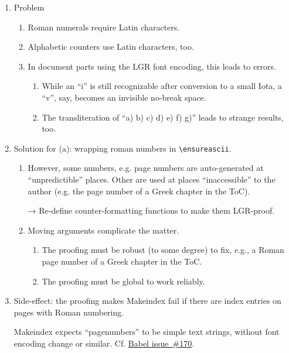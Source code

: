 \documentclass[a4paper,oneside]{book}
\begin{document}
\begin{enumerate}
  \item Problem
  \begin{enumerate}
    \item Roman numerals require Latin characters.
    \item Alphabetic counters use Latin characters, too.
    \item
      In document parts using the LGR font encoding, this leads to errors.
    \begin{enumerate}
      \item While an ``i'' is still recognizable after conversion to a
            small Iota, a ``v'', say, becomes an invisible no-break space.
      \item The transliteration of ``a) b) c) d) e) f) g)''
            leads to strange results, too.%
	    \label{item with roman number}
    \end{enumerate}
  \end{enumerate}
  \item Solution for (a): wrapping roman numbers in \verb|\ensureascii|.
  \begin{enumerate}
    \item However, some numbers, e.g. page numbers are auto-generated
          at ``unpredictible'' places.
          Other are used at places ``inaccessible'' to the author (e.g. the
          page number of a Greek chapter in the ToC).

          → Re-define counter-formatting functions to make them LGR-proof.

    \item Moving arguments complicate the matter.
    \begin{enumerate}
      \item The proofing must be robust (to some degree) to fix, e.g.,
            a Roman page number of a Greek chapter in the ToC.
      \item The proofing must be global to work reliably.
    \end{enumerate}
  \end{enumerate}
  \item Side-effect: the proofing makes Makeindex fail if there are
        index entries on pages with Roman numbering.

        Makeindex expects ``pagenumbers'' to be simple text strings, without
	font encoding change or similar. Cf.
	\href{https://github.com/latex3/babel/issues/170}{Babel issue~\#170}.

\end{enumerate}
\end{document}
